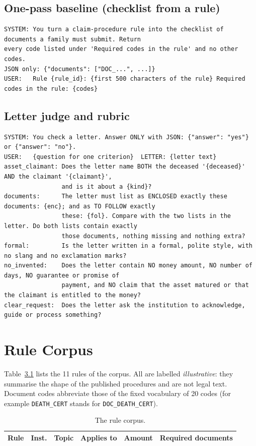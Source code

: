 \section{One-pass baseline (checklist from a rule)}
\begin{lstlisting}[numbers=none,basicstyle=\ttfamily\scriptsize\setstretch{1.0},breaklines=true]
SYSTEM: You turn a claim-procedure rule into the checklist of documents a family must submit. Return
every code listed under 'Required codes in the rule' and no other codes.
JSON only: {"documents": ["DOC_...", ...]}
USER:   Rule {rule_id}: {first 500 characters of the rule} Required codes in the rule: {codes}
\end{lstlisting}

\newpage
\section{Letter judge and rubric}
\begin{lstlisting}[numbers=none,basicstyle=\ttfamily\scriptsize\setstretch{1.0},breaklines=true]
SYSTEM: You check a letter. Answer ONLY with JSON: {"answer": "yes"} or {"answer": "no"}.
USER:   {question for one criterion}  LETTER: {letter text}
asset_claimant: Does the letter name BOTH the deceased '{deceased}' AND the claimant '{claimant}',
                and is it about a {kind}?
documents:      The letter must list as ENCLOSED exactly these documents: {enc}; and as TO FOLLOW exactly
                these: {fol}. Compare with the two lists in the letter. Do both lists contain exactly
                those documents, nothing missing and nothing extra?
formal:         Is the letter written in a formal, polite style, with no slang and no exclamation marks?
no_invented:    Does the letter contain NO money amount, NO number of days, NO guarantee or promise of
                payment, and NO claim that the asset matured or that the claimant is entitled to the money?
clear_request:  Does the letter ask the institution to acknowledge, guide or process something?
\end{lstlisting}

\chapter{Rule Corpus}\label{app:rules}
Table~\ref{tab:rules} lists the 11 rules of the corpus. All are labelled \emph{illustrative}: they summarise the shape of the published procedures and are not legal text. Document codes abbreviate those of the fixed vocabulary of 20 codes (for example \texttt{DEATH\_CERT} stands for \texttt{DOC\_DEATH\_CERT}).

\begin{table}[H]
\centering\small{}
\caption{The rule corpus.}\label{tab:rules}
\renewcommand{\arraystretch}{1.15}
\begin{tabularx}{\linewidth}{@{}p{3.3cm}p{1.2cm}p{1.6cm}p{1.5cm}p{1.1cm}X@{}}
\toprule
\textbf{Rule} & \textbf{Inst.} & \textbf{Topic} & \textbf{Applies to} & \textbf{Amount} & \textbf{Required documents} \\ \midrule

\bottomrule
\end{tabularx}
\end{table}
